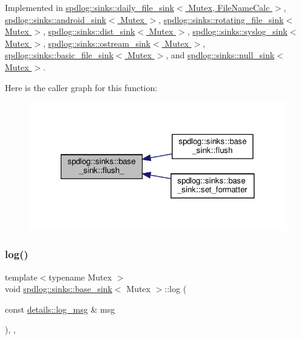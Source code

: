 Implemented in \hyperlink{classspdlog_1_1sinks_1_1daily__file__sink_a37199f25868ac70b91e4f126bcc4b3f8}{spdlog\+::sinks\+::daily\+\_\+file\+\_\+sink$<$ Mutex, File\+Name\+Calc $>$}, \hyperlink{classspdlog_1_1sinks_1_1android__sink_ac71785899fb01c7b0328b66b3727e2c3}{spdlog\+::sinks\+::android\+\_\+sink$<$ Mutex $>$}, \hyperlink{classspdlog_1_1sinks_1_1rotating__file__sink_ae93e4792b76f73bb0be8e50b5c5e889b}{spdlog\+::sinks\+::rotating\+\_\+file\+\_\+sink$<$ Mutex $>$}, \hyperlink{classspdlog_1_1sinks_1_1dist__sink_a790a80f63276473cedbce99047adcab0}{spdlog\+::sinks\+::dist\+\_\+sink$<$ Mutex $>$}, \hyperlink{classspdlog_1_1sinks_1_1syslog__sink_a6afb5ba7ef5e5f2950e624ec650fb562}{spdlog\+::sinks\+::syslog\+\_\+sink$<$ Mutex $>$}, \hyperlink{classspdlog_1_1sinks_1_1ostream__sink_a96458aa6b79019744ef4cb61979c39e0}{spdlog\+::sinks\+::ostream\+\_\+sink$<$ Mutex $>$}, \hyperlink{classspdlog_1_1sinks_1_1basic__file__sink_a689a12d9459d081edff7f8c7d3af227c}{spdlog\+::sinks\+::basic\+\_\+file\+\_\+sink$<$ Mutex $>$}, and \hyperlink{classspdlog_1_1sinks_1_1null__sink_a074c0d22167808789440953111a97926}{spdlog\+::sinks\+::null\+\_\+sink$<$ Mutex $>$}.

Here is the caller graph for this function\+:
\nopagebreak
\begin{figure}[H]
\begin{center}
\leavevmode
\includegraphics[width=321pt]{classspdlog_1_1sinks_1_1base__sink_a5ac2b237c60f68a18122a1ca09b812b4_icgraph}
\end{center}
\end{figure}
\mbox{\label{classspdlog_1_1sinks_1_1base__sink_a6a72602ffe60fdfe6a3cbfbecca54bb0}} 
\subsubsection{\texorpdfstring{log()}{log()}}
{\footnotesize\ttfamily template$<$typename Mutex $>$ \\
void \hyperlink{classspdlog_1_1sinks_1_1base__sink}{spdlog\+::sinks\+::base\+\_\+sink}$<$ Mutex $>$\+::log (\begin{DoxyParamCaption}\item[{const \hyperlink{structspdlog_1_1details_1_1log__msg}{details\+::log\+\_\+msg} \&}]{msg }\end{DoxyParamCaption})\hspace{0.3cm}{\ttfamily [inline]}, {\ttfamily [final]}, {\ttfamily [virtual]}}



